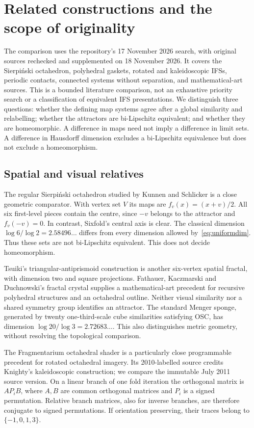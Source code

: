 \section{Related constructions and the scope of originality}\label{sec:originality}
The comparison uses the repository's 17 November 2026 search, with original
sources rechecked and supplemented on 18 November 2026. It covers the
Sierpi\'nski octahedron, polyhedral gaskets, rotated and kaleidoscopic IFSs,
periodic contacts, connected systems without separation, and mathematical-art
sources. This is a bounded literature comparison, not an exhaustive priority
search or a classification of equivalent IFS presentations. We distinguish
three questions: whether the defining map systems agree after a global
similarity and relabelling; whether the attractors are bi-Lipschitz equivalent;
and whether they are homeomorphic. A difference in maps need not imply a
difference in limit sets. A difference in Hausdorff dimension excludes a
bi-Lipschitz equivalence but does not exclude a homeomorphism.

\subsection{Spatial and visual relatives}
The regular Sierpi\'nski octahedron studied by Kunnen and Schlicker
\cite{kunnen} is a close geometric comparator. With vertex set $V$ its maps
are $f_v(x)=(x+v)/2$. All six first-level pieces contain the centre, since
$-v$ belongs to the attractor and $f_v(-v)=0$. In contrast, Sixfold's central
axis is clear. The classical dimension $\log6/\log2=2.58496\ldots$ differs
from every dimension allowed by~\eqref{eq:uniformdim}. Thus these sets are
not bi-Lipschitz equivalent. This does not decide homeomorphism.

Tsuiki's triangular-antiprismoid construction \cite{tsuiki} is another
six-vertex spatial fractal, with dimension two and square projections.
Fathauer, Kaczmarski and Duchnowski's fractal crystal \cite{fathauer}
supplies a mathematical-art precedent for recursive polyhedral structures
and an octahedral outline. Neither visual similarity nor a shared symmetry
group identifies an attractor. The standard Menger sponge, generated by
twenty one-third-scale cube similarities satisfying OSC, has dimension
$\log20/\log3=2.72683\ldots$. This also distinguishes metric geometry,
without resolving the topological comparison.

The Fragmentarium octahedral shader \cite{syntopia} is a particularly close
programmable precedent for rotated octahedral imagery. Its 2010-labelled
source credits Knighty's kaleidoscopic construction; we compare the immutable
July 2011 source version. On a linear branch of one fold iteration the
orthogonal matrix is $AP_iB$, where $A,B$ are common orthogonal matrices and
$P_i$ is a signed permutation. Relative branch matrices, also for inverse
branches, are therefore conjugate to signed permutations. If orientation
preserving, their traces belong to $\{-1,0,1,3\}$.

